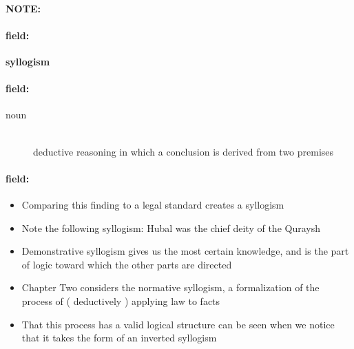 \documentclass[12pt]{article}
\newenvironment{note}{\paragraph{NOTE:}}{}
\newenvironment{field}{\paragraph{field:}}{}
\begin{document}
\begin{note}
\begin{field}
\textbf{\large syllogism}
\end{field}


\begin{field}
\begin{description}
\item[noun] \hfill \\ 
deductive reasoning in which a conclusion is derived from two premises

\end{description}
\end{field}

\begin{field}
\begin{itemize}
\item Comparing this finding to a legal standard creates a syllogism
\item Note the following syllogism: Hubal was the chief deity of the Quraysh
\item Demonstrative syllogism gives us the most certain knowledge, and is the part of logic toward which the other parts are directed
\item Chapter Two considers the normative syllogism, a formalization of the process of ( deductively ) applying law to facts
\item That this process has a valid logical structure can be seen when we notice that it takes the form of an inverted syllogism
\end{itemize}
\end{field}
\end{note}
\end{document}
